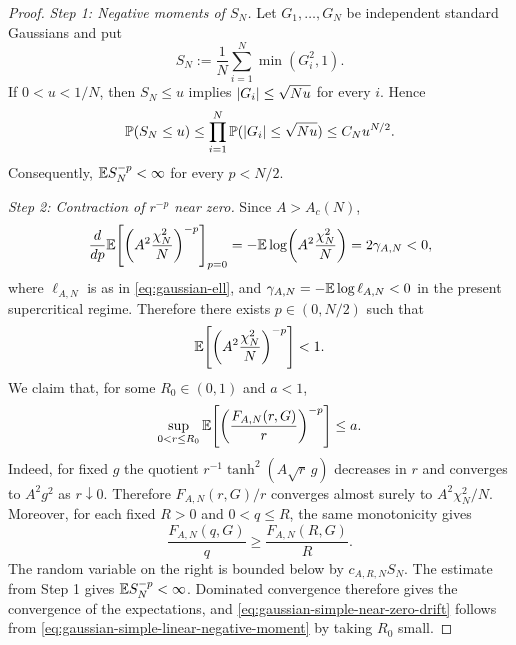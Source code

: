 \documentclass[11pt,reqno,a4paper]{article}
\newcommand{\Pp}{\P}
\newcommand{\Ee}{\E}
\begin{document}
\begin{proof}
  \emph{Step 1: Negative moments of $S_N$.}
  Let $G_1,\ldots,G_N$ be independent standard Gaussians and put
  \begin{equation*}
    S_N:=\frac1N\sum_{i=1}^N\min(G_i^2,1).
  \end{equation*}
  If $0<u<1/N$, then $S_N\leq u$ implies
  $\abs{G_i}\leq\sqrt{Nu}$ for every $i$. Hence
  \begin{equation*}
    \Pp(S_N\leq u)
    \leq
    \prod_{i=1}^N\Pp(\abs{G_i}\leq\sqrt{Nu})
    \leq
    C_N u^{N/2}.
  \end{equation*}
  Consequently, $\Ee S_N^{-p}<\infty$ for every $p<N/2$.

  \emph{Step 2: Contraction of $r^{-p}$ near zero.}
  Since $A>A_c(N)$,
  \begin{equation*}
    \frac{d}{dp} \Ee\left[
      \left(A^2\frac{\chi_N^2}{N}\right)^{-p}
    \right]_{p=0}
    =
    -\Ee\log\left(A^2\frac{\chi_N^2}{N}\right)
    =2\gamma_{A,N}<0,
  \end{equation*}
  where $\ell_{A,N}$ is as in \cref{eq:gaussian-ell}, and
  $\gamma_{A,N}=-\Ee\log\ell_{A,N}<0$ in the present supercritical regime.
  Therefore there exists $p\in(0,N/2)$ such that
  \begin{equation}\label{eq:gaussian-simple-linear-negative-moment}
    \Ee\left[
      \left(A^2\frac{\chi_N^2}{N}\right)^{-p}
    \right]
    <1 .
  \end{equation}
  We claim that, for some $R_0\in(0,1)$ and $a<1$,
  \begin{equation}\label{eq:gaussian-simple-near-zero-drift}
    \sup_{0<r\leq R_0}
    \Ee\left[
      \left(\frac{F_{A,N}(r,G)}{r}\right)^{-p}
    \right]
    \leq a .
  \end{equation}
  Indeed, for fixed $g$ the quotient
  $r^{-1}\tanh^2(A\sqrt r\,g)$ decreases in $r$ and converges to
  $A^2g^2$ as $r\downarrow0$. Therefore
  $F_{A,N}(r,G)/r$ converges almost surely to
  $A^2\chi_N^2/N$. Moreover, for each fixed $R>0$ and $0<q\leq R$, the same
  monotonicity gives
  \begin{equation*}
    \frac{F_{A,N}(q,G)}q
    \geq
    \frac{F_{A,N}(R,G)}R .
  \end{equation*}
  The random variable on the right is bounded below by $c_{A,R,N}S_N$.
  The estimate from Step 1 gives
  $\Ee S_N^{-p}<\infty$. Dominated convergence therefore gives the convergence
  of the expectations, and \cref{eq:gaussian-simple-near-zero-drift} follows from
  \cref{eq:gaussian-simple-linear-negative-moment} by taking $R_0$ small.


\end{proof}
\end{document}

